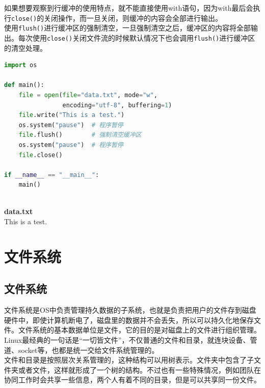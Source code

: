 如果想要观察到行缓冲的使用特点，就不能直接使用with语句，因为with最后会执行\lstinline|close()|的关闭操作，而一旦关闭，则缓冲的内容会全部进行输出。 \\

使用\lstinline|flush()|进行缓冲区的强制清空，一旦强制清空之后，缓冲区的内容将全部输出。每次使用\lstinline|close()|关闭文件流的时候默认情况下也会调用\lstinline|flush()|进行缓冲区的清空处理。 \\

\begin{lstlisting}[language=Python]
import os

def main():
    file = open(file="data.txt", mode="w",
                encoding="utf-8", buffering=1)
    file.write("This is a test.")
    os.system("pause")  # 程序暂停
    file.flush()        # 强制清空缓冲区
    os.system("pause")  # 程序暂停
    file.close()

if __name__ == "__main__":
    main()
\end{lstlisting}
    
\begin{tcolorbox}
     \\
    \textbf{data.txt} \\
    This is a test.
\end{tcolorbox}

\newpage

\section{文件系统}

\subsection{文件系统}

文件系统是OS中负责管理持久数据的子系统，也就是负责把用户的文件存到磁盘硬件中，即使计算机断电了，磁盘里的数据并不会丢失，所以可以持久化地保存文件。文件系统的基本数据单位是文件，它的目的是对磁盘上的文件进行组织管理。 \\

Linux最经典的一句话是``一切皆文件”，不仅普通的文件和目录，就连块设备、管道、socket等，也都是统一交给文件系统管理的。 \\

文件和目录是按照层次关系管理的，这种结构可以用树表示。文件夹中包含了子文件夹或者文件，这样就形成了一个树的结构。不过也有一些特殊情况，例如团队在协同工作时会共享一些信息，两个人有着不同的目录，但是可以共享同一份文件。 \\

